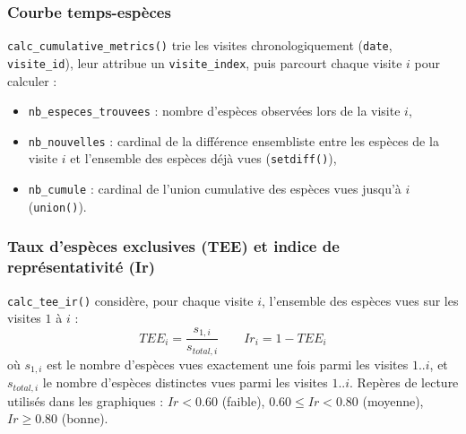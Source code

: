 \documentclass[11pt,a4paper]{article}
\begin{document}
\subsubsection{Courbe temps-espèces}
\texttt{calc\_cumulative\_metrics()} trie les visites chronologiquement (\texttt{date}, \texttt{visite\_id}), leur attribue un \texttt{visite\_index}, puis parcourt chaque visite $i$ pour calculer :
\begin{itemize}[leftmargin=1.2cm]
  \item \texttt{nb\_especes\_trouvees} : nombre d'espèces observées lors de la visite $i$,
  \item \texttt{nb\_nouvelles} : cardinal de la différence ensembliste entre les espèces de la visite $i$ et l'ensemble des espèces déjà vues (\texttt{setdiff()}),
  \item \texttt{nb\_cumule} : cardinal de l'union cumulative des espèces vues jusqu'à $i$ (\texttt{union()}).
\end{itemize}

\subsubsection{Taux d'espèces exclusives (TEE) et indice de représentativité (Ir)}
\texttt{calc\_tee\_ir()} considère, pour chaque visite $i$, l'ensemble des espèces vues sur les
visites $1$ à $i$ :
$$ TEE_i = \frac{s_{1,i}}{s_{total,i}} \qquad Ir_i = 1 - TEE_i $$
où $s_{1,i}$ est le nombre d'espèces vues exactement une fois parmi les visites $1..i$, et
$s_{total,i}$ le nombre d'espèces distinctes vues parmi les visites $1..i$. Repères de
lecture utilisés dans les graphiques : $Ir < 0.60$ (faible), $0.60 \le Ir < 0.80$ (moyenne),
$Ir \ge 0.80$ (bonne).
\end{document}
